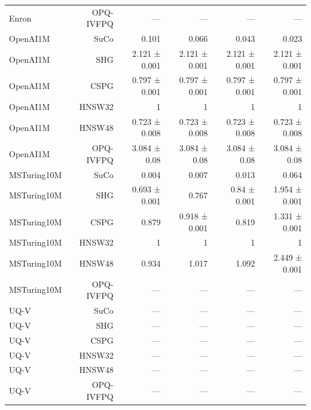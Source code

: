 \begin{table}[t]
\begin{tabular}{lrrrrr}
Enron & OPQ-IVFPQ & — & — & — & — \\
OpenAI1M & SuCo & 0.101 & 0.066 & 0.043 & 0.023 \\
OpenAI1M & SHG & 2.121 ± 0.001 & 2.121 ± 0.001 & 2.121 ± 0.001 & 2.121 ± 0.001 \\
OpenAI1M & CSPG & 0.797 ± 0.001 & 0.797 ± 0.001 & 0.797 ± 0.001 & 0.797 ± 0.001 \\
OpenAI1M & HNSW32 & 1 & 1 & 1 & 1 \\
OpenAI1M & HNSW48 & 0.723 ± 0.008 & 0.723 ± 0.008 & 0.723 ± 0.008 & 0.723 ± 0.008 \\
OpenAI1M & OPQ-IVFPQ & 3.084 ± 0.08 & 3.084 ± 0.08 & 3.084 ± 0.08 & 3.084 ± 0.08 \\
MSTuring10M & SuCo & 0.004 & 0.007 & 0.013 & 0.064 \\
MSTuring10M & SHG & 0.693 ± 0.001 & 0.767 & 0.84 ± 0.001 & 1.954 ± 0.001 \\
MSTuring10M & CSPG & 0.879 & 0.918 ± 0.001 & 0.819 & 1.331 ± 0.001 \\
MSTuring10M & HNSW32 & 1 & 1 & 1 & 1 \\
MSTuring10M & HNSW48 & 0.934 & 1.017 & 1.092 & 2.449 ± 0.001 \\
MSTuring10M & OPQ-IVFPQ & — & — & — & — \\
UQ-V & SuCo & — & — & — & — \\
UQ-V & SHG & — & — & — & — \\
UQ-V & CSPG & — & — & — & — \\
UQ-V & HNSW32 & — & — & — & — \\
UQ-V & HNSW48 & — & — & — & — \\
UQ-V & OPQ-IVFPQ & — & — & — & — \\
\bottomrule
\end{tabular}
\end{table}
